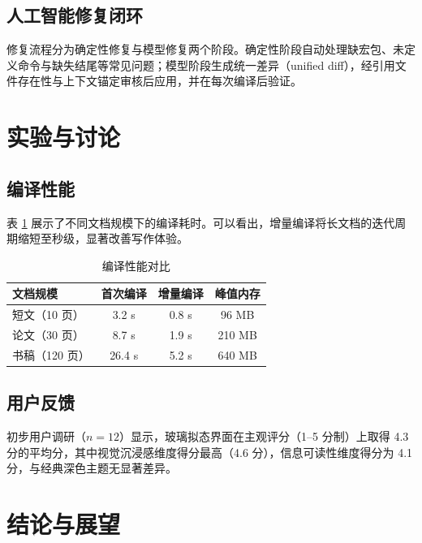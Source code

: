 \documentclass[11pt]{ctexart}
\begin{document}
\subsection{人工智能修复闭环}

修复流程分为确定性修复与模型修复两个阶段。确定性阶段自动处理缺宏包、未定义命令与缺失结尾等常见问题；模型阶段生成统一差异（unified diff），经引用文件存在性与上下文锚定审核后应用，并在每次编译后验证。


\section{实验与讨论}

\subsection{编译性能}

表 \ref{tab:perf} 展示了不同文档规模下的编译耗时。可以看出，增量编译将长文档的迭代周期缩短至秒级，显著改善写作体验。

\begin{table}[H]
\centering
\caption{编译性能对比}
\label{tab:perf}
\begin{tabular}{lccc}
\toprule
文档规模 & 首次编译 & 增量编译 & 峰值内存 \\
\midrule
短文（10 页） & 3.2 s & 0.8 s & 96 MB \\
论文（30 页） & 8.7 s & 1.9 s & 210 MB \\
书稿（120 页） & 26.4 s & 5.2 s & 640 MB \\
\bottomrule
\end{tabular}
\end{table}

\subsection{用户反馈}

初步用户调研（$n = 12$）显示，玻璃拟态界面在主观评分（1--5 分制）上取得 4.3 分的平均分，其中视觉沉浸感维度得分最高（4.6 分），信息可读性维度得分为 4.1 分，与经典深色主题无显著差异。

\section{结论与展望}
\end{document}
